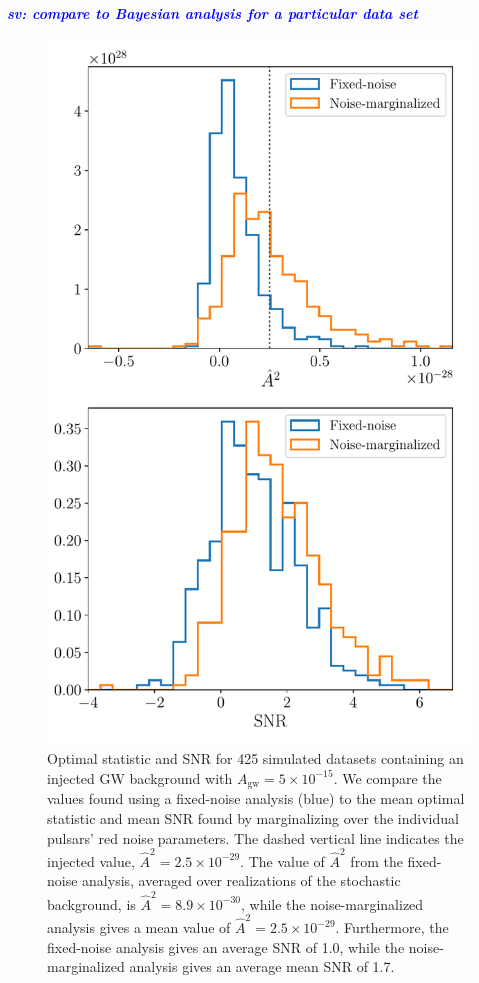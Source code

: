 \documentclass[twocolumn,aps,prd,superscriptaddress]{revtex4-1}
\newcommand{\sv}[1]{\textcolor{blue}{\it{\textbf{sv: #1}}} }
\newcommand{\Agw}{\ensuremath{A_\mathrm{gw}}}
\begin{document}
\sv{compare to Bayesian analysis for a particular data set}

\begin{figure}[ht]
	\includegraphics[width=\columnwidth]{plots/os_datasetstats_5e-15.pdf}
	\caption{Optimal statistic and SNR for 425 simulated datasets 
			containing an injected GW background with $\Agw = 5\times10^{-15}$. 
			We compare the values found using a fixed-noise analysis (blue) to the 
			mean optimal statistic and mean SNR found by marginalizing over 
			the individual pulsars' red noise parameters. The dashed vertical line 
			indicates the injected value, $\hat{A}^2 = 2.5 \times 10^{-29}$. 
			The value of $\hat{A}^2$ from the fixed-noise analysis, 
			averaged over realizations of the stochastic background, is $\hat{A}^2 = 8.9 \times 10^{-30}$, 
			while the noise-marginalized analysis gives a mean value of $\hat{A}^2 = 2.5 \times 10^{-29}$. 
			Furthermore, the fixed-noise analysis gives an average SNR of 1.0, while the 
			noise-marginalized analysis gives an average mean SNR of 1.7.}
	\label{fig:os_datasetstats}
\end{figure}
\end{document}
